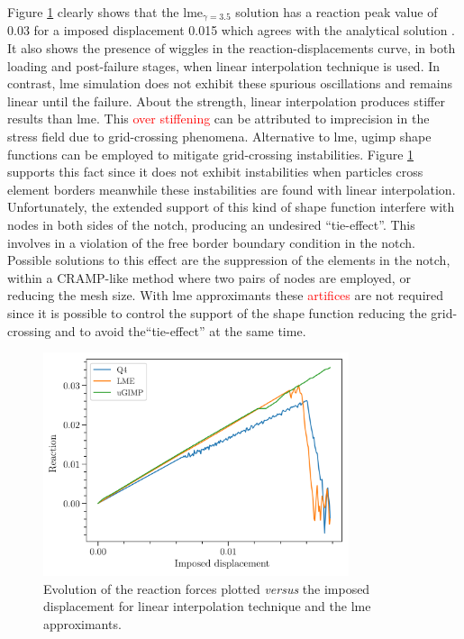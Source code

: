 \documentclass[preprint,12pt,a4paper]{elsarticle}
\begin{document}
Figure \ref{fig:Reactions-cracked-panel-mode-I} clearly shows that the
\acrshort{lme}$_{\gamma = 3.5}$ solution has a reaction peak value of 0.03 for a imposed displacement 0.015 which agrees with the
analytical solution \cite{Pandolfi_2012}. It also shows the presence
of wiggles in the reaction-displacements curve, in both loading and
post-failure stages, when linear interpolation technique is used. In
contrast, \acrshort{lme} simulation does not exhibit these spurious
oscillations and remains linear until the failure. About the strength, linear interpolation produces stiffer results than \acrshort{lme}. This \textcolor{red}{over stiffening} can be attributed to imprecision in the stress field due to grid-crossing phenomena. Alternative to
  \acrshort{lme}, \acrshort{ugimp} shape
functions can be employed to mitigate grid-crossing instabilities.
Figure \ref{fig:Reactions-cracked-panel-mode-I} supports this fact since it
does not exhibit instabilities when particles cross element borders meanwhile these instabilities are found with linear interpolation. Unfortunately, the extended support of this kind of shape function interfere with nodes in both sides of the notch, producing an undesired ``tie-effect''. This involves in a violation of the free border boundary condition in the notch. Possible solutions to this effect are the suppression of the elements in the notch, within a CRAMP-like method where two pairs of nodes are employed, or reducing the mesh size. With \acrshort{lme} approximants these \textcolor{red}{artifices} are not required since it is possible to control the support of the shape function reducing the grid-crossing and to avoid the``tie-effect'' at the same time.\\
\begin{figure}
  \centering
  \includegraphics[width=0.8\textwidth]{Figure-Reactions-Mode-I}
  \caption{Evolution of the reaction forces plotted \textit{versus}
    the imposed displacement for linear interpolation technique and
    the \acrshort{lme} approximants.}
  \label{fig:Reactions-cracked-panel-mode-I}
\end{figure}
\end{document}
